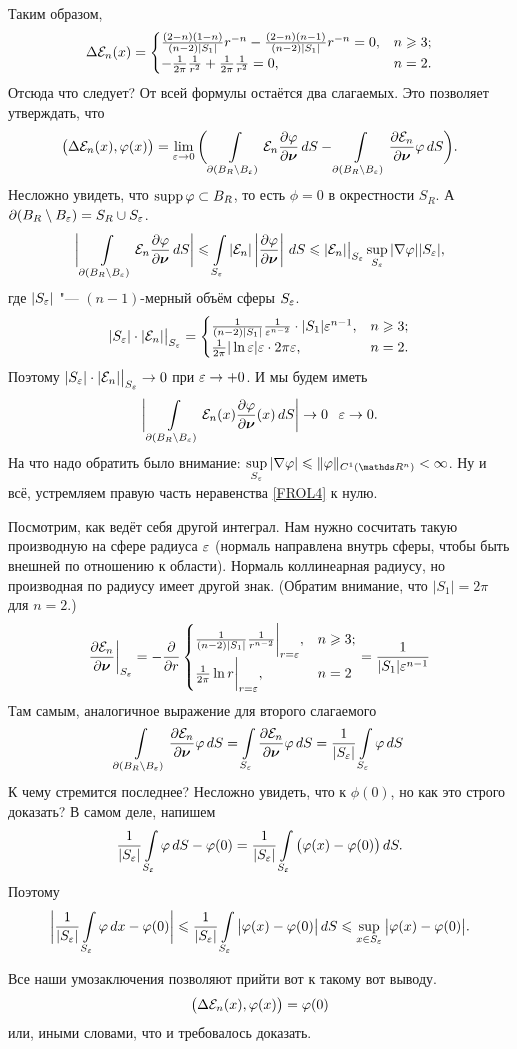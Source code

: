 \begin{Proof}
Таким образом, 
\[
  \Delta\mathcal E_n(x) = \begin{cases}
    \frac{(2-n)(1-n)}{(n-2)|S_1|}r^{-n} - \frac{(2-n)(n-1)}{(n-2)|S_1|}r^{-n} = 0,&n\geqslant 3;\\
    -\frac1{2\pi}\frac1{r^2} + \frac1{2\pi}\frac1{r^2} = 0,&n=2.
\end{cases}
\]
Отсюда что следует? От всей формулы остаётся два слагаемых. Это позволяет утверждать, что 
\[
  \big(\Delta\mathcal E_n(x),\varphi(x)\big) = \lim\limits_{\varepsilon\rightarrow0}\bigg(\int\limits_{\partial(B_R\setminus B_\varepsilon)}\mathcal E_n\frac{\partial \varphi}{\partial \boldsymbol{\nu}}\,dS - 
    \int\limits_{\partial(B_R\setminus B_\varepsilon)}\frac{\partial \mathcal E_n}{\partial \boldsymbol{\nu}}\varphi\,dS\bigg).
\]
Несложно увидеть, что $\operatorname{supp}\varphi\subset B_R$, то есть $\phi=0$ в окрестности $S_R$. А $\partial(B_R\setminus B_\varepsilon) = S_R\cup S_\varepsilon$.
\begin{equation}\label{FROL4}
  \bigg|\int\limits_{\partial(B_R\setminus B_\varepsilon)}\mathcal E_n\frac{\partial \varphi}{\partial \boldsymbol{\nu}}\,dS \bigg|\leqslant \int\limits_{S_\varepsilon}|\mathcal E_n|\left|\frac{\partial \varphi}{\partial \boldsymbol{\nu}}\right|\,dS\leqslant|\mathcal E_n|\big|_{S_\varepsilon}\sup\limits_{S_\varepsilon}|\nabla\varphi||S_\varepsilon|,
\end{equation}
где $|S_\varepsilon|$ "--- $(n-1)$-мерный объём сферы $S_\varepsilon$.
\[
  |S_\varepsilon|\cdot |\mathcal E_n|\big|_{S_\varepsilon} = \begin{cases}
    \frac1{(n-2)|S_1|}\frac1{\varepsilon^{n-2}}\cdot |S_1|\varepsilon^{n-1},&n\geqslant3;\\
    \frac1{2\pi}|\ln\varepsilon|\varepsilon \cdot 2\pi \varepsilon,&n=2.
\end{cases}
\]
Поэтому $|S_\varepsilon|\cdot |\mathcal E_n|\big|_{S_\varepsilon}\rightarrow0$ при $\varepsilon\rightarrow+0$. И мы будем иметь
\[
  \bigg|\int\limits_{\partial(B_R\setminus B_\varepsilon)}\mathcal E_n(x)\frac{\partial \varphi}{\partial \boldsymbol{\nu}}(x)\,dS\bigg|\rightarrow0\hskip .75em plus.1em minus.08em\relax \varepsilon\rightarrow0.
\]
На что надо обратить было внимание: $\sup\limits_{S_{\e}}|\nabla\phi|\le\|\phi\|_{C^1(\R^n)}<\infty$. Ну и всё, устремляем правую часть неравенства \eqref{FROL4} к нулю.

Посмотрим, как ведёт себя другой интеграл. Нам нужно сосчитать такую производную на сфере радиуса $\varepsilon$ (нормаль направлена внутрь сферы, чтобы быть внешней по отношению к области). Нормаль коллинеарная радиусу, но производная по радиусу имеет другой знак. (Обратим внимание, что $|S_1|=2\pi$ для $n=2$.)
\[
  \frac{\partial \mathcal E_n}{\partial \boldsymbol{\nu}}\bigg|_{S_\varepsilon} = - \frac{\partial }{\partial r}\begin{cases}
    \frac1{(n-2)|S_1|}\frac1{r^{n-2}}\bigg|_{r=\varepsilon},&n\geqslant3;\\
    \frac1{2\pi}\ln r\bigg|_{r = \varepsilon},&n=2
  \end{cases} = 
  \frac1{|S_1|\varepsilon^{n-1}}
\]
Там самым, аналогичное выражение для второго слагаемого
\[
  \int\limits_{\partial(B_R\setminus B_\varepsilon)}\frac{\partial \mathcal E_n}{\partial \boldsymbol{\nu}}\varphi\,dS = \int\limits_{S_\varepsilon}\frac{\partial \mathcal E_n}{\partial \boldsymbol{\nu}}\varphi\,dS = \frac1{|S_\varepsilon|}\int\limits_{S_\varepsilon}\varphi\,dS
\]
К чему стремится последнее? Несложно увидеть, что к $\phi(0)$, но как это строго доказать? В самом деле, напишем 
\[
  \frac1{|S_\varepsilon|}\int\limits_{S_\varepsilon}\varphi\,dS - \varphi(0) = \frac1{|S_\varepsilon|}\int\limits_{S_\varepsilon}\big(\varphi(x)-\varphi(0)\big)\,dS.
\]
Поэтому 
\[
  \bigg|\frac1{|S_\varepsilon|}\int\limits_{S_\varepsilon}\varphi\,dx - \varphi(0)\bigg|\leqslant \frac1{|S_\varepsilon|}\int\limits_{S_\varepsilon}\big|\varphi(x) - \varphi(0)\big|\,dS\leqslant\sup\limits_{x\in S_\varepsilon}\big|\varphi(x) - \varphi(0)\big|.
\]

Все наши умозаключения позволяют прийти вот к такому вот выводу.
\[
  \big(\Delta\mathcal E_n(x),\varphi(x)\big) = \varphi(0)
\]
или, иными словами, что и требовалось доказать.
\end{Proof}

